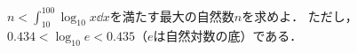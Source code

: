 \documentclass[../../main.tex]{subfiles}
\begin{document}
$n<\int_{10}^{100}\log_{10} x \dd x$を満たす最大の自然数$n$を求めよ．
ただし，$0.434<\log_{10} e< 0.435$（$e$は自然対数の底）である．
\end{document}
